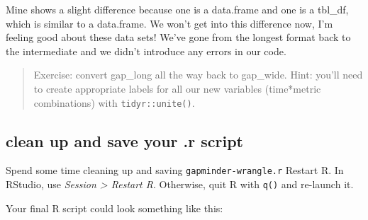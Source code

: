 \documentclass[]{book}
\newenvironment{Shaded}{\begin{snugshade}}{\end{snugshade}}
\newcommand{\KeywordTok}[1]{\textcolor[rgb]{0.13,0.29,0.53}{\textbf{{#1}}}}
\newcommand{\DataTypeTok}[1]{\textcolor[rgb]{0.13,0.29,0.53}{{#1}}}
\newcommand{\StringTok}[1]{\textcolor[rgb]{0.31,0.60,0.02}{{#1}}}
\newcommand{\CommentTok}[1]{\textcolor[rgb]{0.56,0.35,0.01}{\textit{{#1}}}}
\newcommand{\NormalTok}[1]{{#1}}
\theoremstyle{definition}
\theoremstyle{definition}
\theoremstyle{definition}
\theoremstyle{remark}
\begin{document}
Mine shows a slight difference because one is a data.frame and one is a
tbl\_df, which is similar to a data.frame. We won't get into this
difference now, I'm feeling good about these data sets! We've gone from
the longest format back to the intermediate and we didn't introduce any
errors in our code.

\begin{quote}
Exercise: convert gap\_long all the way back to gap\_wide. Hint: you'll
need to create appropriate labels for all our new variables (time*metric
combinations) with \texttt{tidyr::unite()}.
\end{quote}

\begin{Shaded}
\end{Shaded}

\subsection{clean up and save your .r
script}\label{clean-up-and-save-your-.r-script}

Spend some time cleaning up and saving \texttt{gapminder-wrangle.r}
Restart R. In RStudio, use \emph{Session \textgreater{} Restart R}.
Otherwise, quit R with \texttt{q()} and re-launch it.

Your final R script could look something like this:
\end{document}
